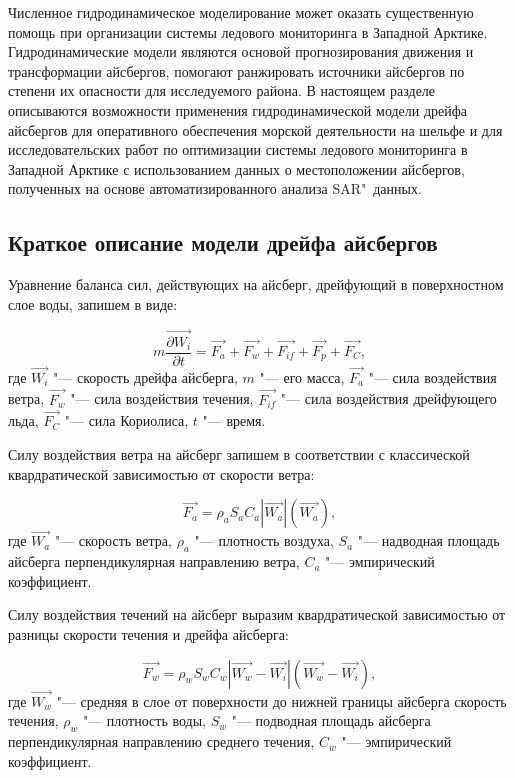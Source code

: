 Численное гидродинамическое моделирование может оказать существенную помощь при организации системы ледового мониторинга в Западной Арктике. Гидродинамические модели являются основой прогнозирования движения и трансформации айсбергов, помогают ранжировать источники айсбергов по степени их опасности для исследуемого района. В настоящем разделе описываются возможности применения гидродинамической модели дрейфа айсбергов для оперативного обеспечения морской деятельности на шельфе и для исследовательских работ по оптимизации системы ледового мониторинга в Западной Арктике с использованием данных о местоположении айсбергов, полученных на основе автоматизированного анализа SAR"~данных.

\subsection{Краткое описание модели дрейфа айсбергов} \label{subsect4_1_1}

Уравнение баланса сил, действующих на айсберг, дрейфующий в поверхностном слое воды, запишем в виде:

\begin{equation}
\label{eq:equation4_1}
m{\frac{\vec{\partial W_i}}{\partial t}} = \vec{F_a}+\vec{F_w}+\vec{F_{if}}+\vec{F_p}+\vec{F_C},
\end{equation}
где $\vec{W_i}$ "--- скорость дрейфа айсберга, $m$ "--- его масса, $\vec{F_a}$ "--- сила воздействия ветра, $\vec{F_w}$ "--- сила воздействия течения, $\vec{F_{if}}$ "--- сила воздействия дрейфующего льда, $\vec{F_C}$ "--- сила Кориолиса, $t$ "--- время.

Силу воздействия ветра на айсберг запишем в соответствии с классической квардратической зависимостью от скорости ветра:

\begin{equation}
\label{eq:equation4_2}
\vec{F_a} = \rho_{a}S_{a}C_{a}\left|{\vec{W_a}}\right|\left(\vec{W_a}\right),
\end{equation}
где $\vec{W_a}$ "--- скорость ветра, $\rho_{a}$ "--- плотность воздуха, $S_{a}$ "--- надводная площадь айсберга перпендикулярная направлению ветра, $C_{a}$ "---  эмпирический коэффициент.

Силу воздействия течений на айсберг выразим квардратической зависимостью от разницы скорости течения и дрейфа айсберга:

\begin{equation}
\label{eq:equation4_3}
\vec{F_w} = \rho_{w}S_{w}C_{w}\left|{\vec{W_w}-\vec{W_i}}\right|\left({\vec{W_w}-\vec{W_i}}\right),
\end{equation}
где $\vec{W_w}$ "--- средняя в слое от поверхности до нижней границы айсберга скорость течения, $\rho_{w}$ "--- плотность воды, $S_{w}$ "--- подводная площадь айсберга перпендикулярная направлению среднего течения, $C_{w}$ "---  эмпирический коэффициент.

